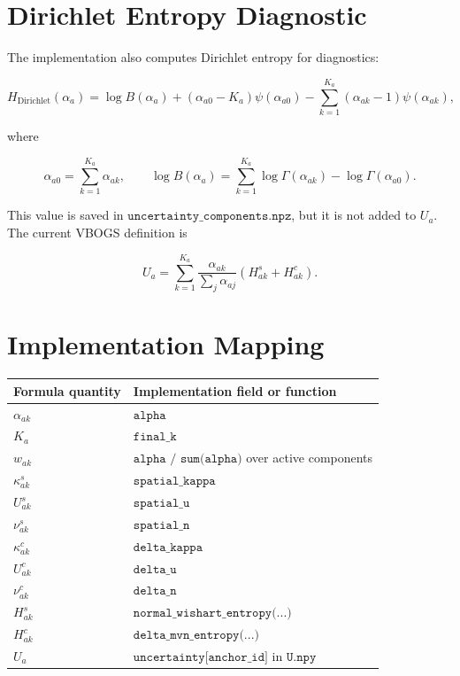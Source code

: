 \documentclass[11pt]{article}
\newcommand{\Dir}{\operatorname{Dirichlet}}
\begin{document}
\section{Dirichlet Entropy Diagnostic}

The implementation also computes Dirichlet entropy for diagnostics:

\[
  H_{\Dir}(\alpha_a)
  =
  \log B(\alpha_a)
  +
  (\alpha_{a0} - K_a)\psi(\alpha_{a0})
  -
  \sum_{k=1}^{K_a}
  (\alpha_{ak} - 1)\psi(\alpha_{ak}),
\]

where

\[
  \alpha_{a0}
  =
  \sum_{k=1}^{K_a}
  \alpha_{ak},
  \qquad
  \log B(\alpha_a)
  =
  \sum_{k=1}^{K_a}\log\Gamma(\alpha_{ak})
  -
  \log\Gamma(\alpha_{a0}).
\]

This value is saved in \(\texttt{uncertainty\_components.npz}\), but it is not
added to \(U_a\). The current VBOGS definition is

\[
  \boxed{
    U_a
    =
    \sum_{k=1}^{K_a}
    \frac{\alpha_{ak}}
         {\sum_j \alpha_{aj}}
    \left(
      H^s_{ak} + H^c_{ak}
    \right)
  }.
\]

\section{Implementation Mapping}

\begin{center}
\begin{tabular}{ll}
\toprule
Formula quantity & Implementation field or function \\
\midrule
\(\alpha_{ak}\) & \(\texttt{alpha}\) \\
\(K_a\) & \(\texttt{final\_k}\) \\
\(w_{ak}\) & \(\texttt{alpha / sum(alpha)}\) over active components \\
\(\kappa^s_{ak}\) & \(\texttt{spatial\_kappa}\) \\
\(U^s_{ak}\) & \(\texttt{spatial\_u}\) \\
\(\nu^s_{ak}\) & \(\texttt{spatial\_n}\) \\
\(\kappa^c_{ak}\) & \(\texttt{delta\_kappa}\) \\
\(U^c_{ak}\) & \(\texttt{delta\_u}\) \\
\(\nu^c_{ak}\) & \(\texttt{delta\_n}\) \\
\(H^s_{ak}\) & \(\texttt{normal\_wishart\_entropy(...)}\) \\
\(H^c_{ak}\) & \(\texttt{delta\_mvn\_entropy(...)}\) \\
\(U_a\) & \(\texttt{uncertainty[anchor\_id]}\) in \(\texttt{U.npy}\) \\
\bottomrule
\end{tabular}
\end{center}
\end{document}
